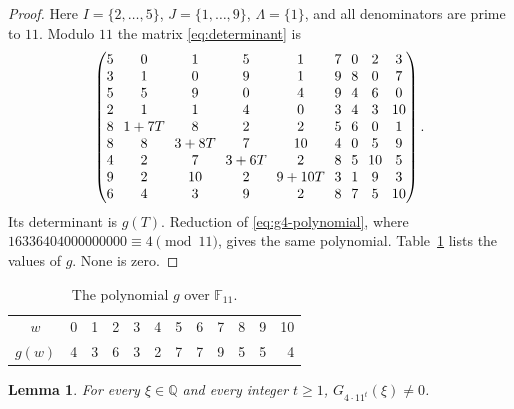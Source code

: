 \documentclass{amsart}
\newtheorem{lemma}{Lemma}[section]
\numberwithin{equation}{section}
\numberwithin{table}{section}
\begin{document}
\begin{proof}
Here $I=\{2,\ldots,5\}$, $J=\{1,\ldots,9\}$, $\Lambda=\{1\}$, and all
denominators are prime to $11$. Modulo $11$ the matrix
\eqref{eq:determinant} is
\begin{equation}\label{eq:g4-mod-matrix}
\setlength{\arraycolsep}{3.5pt}
\begin{pmatrix}
5&0&1&5&1&7&0&2&3\\
3&1&0&9&1&9&8&0&7\\
5&5&9&0&4&9&4&6&0\\
2&1&1&4&0&3&4&3&10\\
8&1+7T&8&2&2&5&6&0&1\\
8&8&3+8T&7&10&4&0&5&9\\
4&2&7&3+6T&2&8&5&10&5\\
9&2&10&2&9+10T&3&1&9&3\\
6&4&3&9&2&8&7&5&10
\end{pmatrix}.
\end{equation}
Its determinant is $g(T)$. Reduction of \eqref{eq:g4-polynomial}, where
$16336404000000000\equiv4\pmod{11}$, gives the same polynomial.
Table~\ref{tab:g-mod-eleven} lists the values of $g$. None is zero.
\end{proof}

\begin{table}[ht]
\caption{The polynomial $g$ over $\mathbb F_{11}$.}\label{tab:g-mod-eleven}
\centering
\begin{tabular}{c|rrrrrrrrrrr}
$w$ & 0 & 1 & 2 & 3 & 4 & 5 & 6 & 7 & 8 & 9 & 10\\
$g(w)$ & 4 & 3 & 6 & 3 & 2 & 7 & 7 & 9 & 5 & 5 & 4
\end{tabular}
\end{table}

\begin{lemma}\label{lem:nonvanishing}
For every $\xi\in\mathbb Q$ and every integer $t\ge1$,
$G_{4\cdot11^t}(\xi)\ne0$.
\end{lemma}
\end{document}
